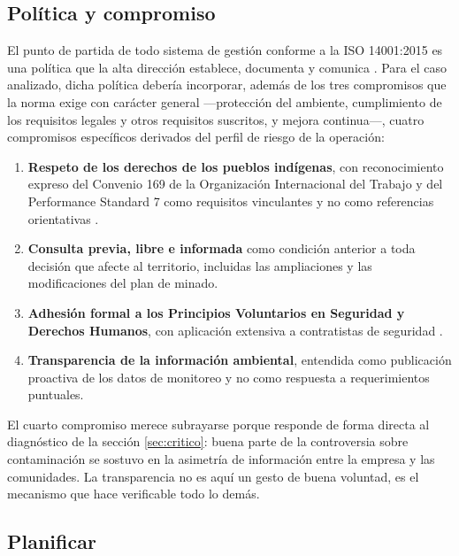 \subsection{Política y compromiso}

El punto de partida de todo sistema de gestión conforme a la ISO 14001:2015 es una
política que la alta dirección establece, documenta y comunica
\parencite{iso2015iso14001}. Para el caso analizado, dicha política debería
incorporar, además de los tres compromisos que la norma exige con carácter general
—protección del ambiente, cumplimiento de los requisitos legales y otros
requisitos suscritos, y mejora continua—, cuatro compromisos específicos derivados
del perfil de riesgo de la operación:

\begin{enumerate}
  \item \textbf{Respeto de los derechos de los pueblos indígenas}, con
        reconocimiento expreso del Convenio 169 de la Organización Internacional
        del Trabajo y del Performance Standard 7 como requisitos vinculantes y no
        como referencias orientativas \parencite{oit1989convenio169}.
  \item \textbf{Consulta previa, libre e informada} como condición anterior a
        toda decisión que afecte al territorio, incluidas las ampliaciones y las
        modificaciones del plan de minado.
  \item \textbf{Adhesión formal a los Principios Voluntarios en Seguridad y
        Derechos Humanos}, con aplicación extensiva a contratistas de seguridad
        \parencite{vpshrsfprincipios}.
  \item \textbf{Transparencia de la información ambiental}, entendida como
        publicación proactiva de los datos de monitoreo y no como respuesta a
        requerimientos puntuales.
\end{enumerate}

El cuarto compromiso merece subrayarse porque responde de forma directa al
diagnóstico de la sección \ref{sec:critico}: buena parte de la controversia sobre
contaminación se sostuvo en la asimetría de información entre la empresa y las
comunidades. La transparencia no es aquí un gesto de buena voluntad, es el
mecanismo que hace verificable todo lo demás.

\subsection{Planificar}

